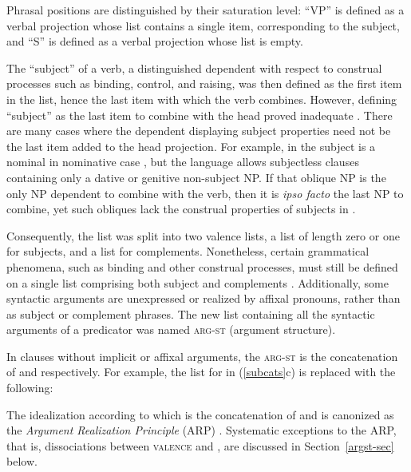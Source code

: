 \documentclass[output=paper
 	        ,biblatex
                ,babelshorthands
                ,newtxmath
                ,draftmode
                ,colorlinks, citecolor=brown
]{langscibook}
\begin{document}
\noindent
Phrasal positions are distinguished by their saturation level: ``VP'' is defined as a verbal projection whose \subcat list contains a single item, corresponding to the subject, and ``S'' is defined as a verbal projection whose  \subcat list is empty. 

The ``subject'' of a verb, a distinguished dependent with respect to
construal processes such as binding, control, and raising, was then defined as the first item in the
\subcat list, hence the last item with which the verb combines.  However, defining ``subject'' as
the last item to combine with the head proved inadequate \citep[Chapter~9]{pollard+sag:1994}.  There
are many cases where the dependent displaying subject properties need not be the last item added to
the head projection.  For example, in  the subject is a nominal in nominative case
\citep{Reis82}, but the language allows subjectless clauses containing only a dative or genitive
non-subject NP.  If that oblique NP is the only NP dependent to combine with
the verb, then it is \emph{ipso facto} the last NP to combine, yet such obliques lack the construal
properties of subjects in .

Consequently, the \subcat list was split into two valence lists, a \subj list of length zero or one
for subjects, and a \comps list for complements.  Nonetheless, certain grammatical phenomena, such
as binding and other construal processes, must still be defined on a single list comprising both
subject and complements \citep{Manning+Sag:1999}. Additionally, some syntactic arguments are
unexpressed or realized by affixal pronouns, rather than as subject or complement phrases.  The new
list containing all the syntactic arguments of a predicator was named \textsc{arg-st} (argument
structure).

In clauses without implicit or affixal arguments, the \textsc{arg-st} is the concatenation of
 and  respectively.  For example, the \subcat list for  in
(\ref{subcats}c) is replaced with the following:

\begin{exe} 
	\label{put}
\ex
{}
\end{exe}

\noindent
The idealization according to which \argst is the concatenation of \subj and \comps is canonized as
the \emph{Argument Realization Principle} (ARP)
\citep[494]{SWB2003a}.  Systematic exceptions to the ARP, that is, dissociations between
\textsc{valence} and \argst, are discussed in Section~\ref{argst-sec} below.
\end{document}

